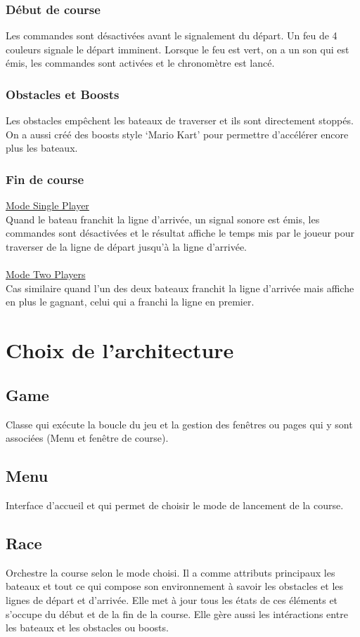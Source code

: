 \documentclass[a4paper,margin=1cm,11pt]{report}
\begin{document}
\subsection{Début de course}
Les commandes sont désactivées avant le signalement du départ. Un feu de 4 couleurs signale le départ imminent. Lorsque le feu est vert, on a un son qui est émis, les commandes sont activées et le chronomètre est lancé.

\subsection{Obstacles et Boosts}
Les obstacles empêchent les bateaux de traverser et ils sont directement stoppés. 
On a aussi créé des boosts style ‘Mario Kart’ pour permettre d’accélérer encore plus les bateaux.

\subsection{Fin de course}
\underline{Mode Single Player}\\
Quand le bateau franchit la ligne d’arrivée, un signal sonore est émis, les commandes sont désactivées et le résultat affiche le temps mis par le joueur pour traverser de la ligne de départ jusqu’à la ligne d’arrivée.\\\\
\underline{Mode Two Players}\\
Cas similaire quand l’un des deux bateaux franchit la ligne d’arrivée mais affiche en plus le gagnant, celui qui a franchi la ligne en premier.


\chapter{Choix de l'architecture}

\section{Game}
Classe qui exécute la boucle du jeu et la gestion des fenêtres ou pages qui y sont associées (Menu et fenêtre de course).

\section{Menu}
Interface d’accueil et qui permet de choisir le mode de lancement de la course.

\section{Race}
Orchestre la course selon le mode choisi. Il a comme attributs principaux les bateaux et tout ce qui compose son environnement à savoir les obstacles et les lignes de départ et d’arrivée.
Elle met à jour tous les états de ces éléments et s’occupe du début et de la fin de la course. Elle gère aussi les intéractions entre les bateaux et les obstacles ou boosts.
\end{document}
